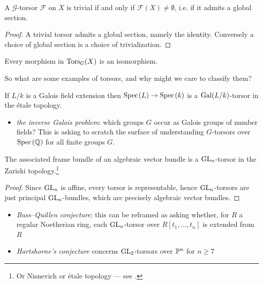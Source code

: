 \documentclass[11pt,openany]{book}
\begin{document}
\begin{proposition}\label{prop:torsor-trivial-iff-global-section} 
A $\mathcal{G}$-torsor $\mathcal{F}$ on $X$ is trivial if and only if $\mathcal{F}(X) \ne \emptyset$, i.e. if it admits a global section.
\end{proposition}
\begin{proof} A trivial torsor admits a global section, namely the identity. Conversely a choice of global section is a choice of trivialization.
\end{proof}




\begin{theorem}\label{thm:every-morphism-in-torsG-is-an-iso} 
Every morphism in $\Tors_G(X)$ is an isomorphism.
\end{theorem}

So what are some examples of torsors, and why might we care to classify them?

\begin{example}\label{exa:galois-field-extn-torsor} 
If $L/k$ is a Galois field extension then $\Spec(L) \to \Spec(k)$ is a $\Gal(L/k)$-torsor in the \'etale topology.
\end{example}
\begin{itemize}
\item \textit{the inverse Galois problem}: which groups $G$ occur as Galois groups of number fields? This is asking to scratch the surface of understanding $G$-torsors over $\Spec(\Q)$ for all finite groups $G$.
\end{itemize}

\begin{example}
The associated frame bundle of an algebraic vector bundle is a $\GL_n$-torsor in the Zariski topology.\footnote{Or Nisnevich or \'etale topology --- see .}
\end{example}
\begin{proof} Since $\GL_n$ is affine, every torsor is representable, hence $\GL_n$-torsors are just principal $\GL_n$-bundles, which are precisely algebraic vector bundles.
\end{proof}
\begin{itemize}
    \item \textit{Bass--Quillen conjecture}: this can be reframed as asking whether, for $R$ a regular Noetherian ring, each $\GL_n$-torsor over $R[t_1,\ldots,t_n]$ is extended from $R$
    \item \textit{Hartshorne's conjecture} concerns $\GL_2$-torsors over $\P^n$ for $n\ge7$
\end{itemize}
\end{document}
